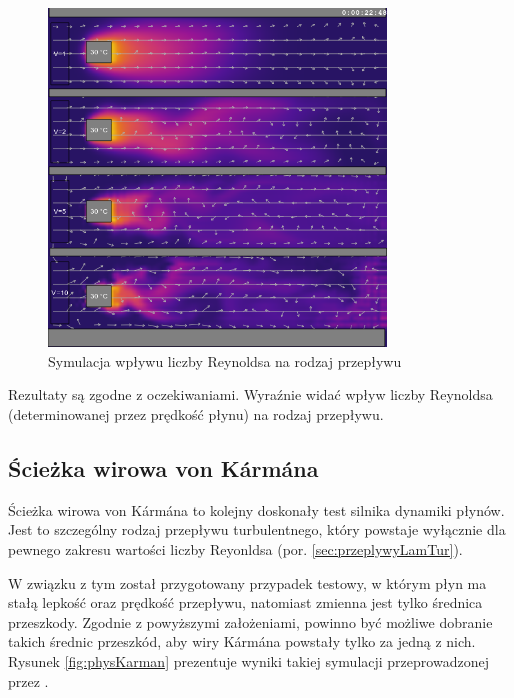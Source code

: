 \begin{figure}[!h]
\centering
\includegraphics[width=0.8\textwidth]{img/physics/laminarTurbulent}
\caption{Symulacja wpływu liczby Reynoldsa na rodzaj przepływu}
\label{fig:physLaminarTurbulent}
\end{figure}

Rezultaty są zgodne z oczekiwaniami. Wyraźnie widać wpływ liczby Reynoldsa
(determinowanej przez prędkość płynu) na rodzaj przepływu.

\subsection{Ścieżka wirowa von Kármána}

Ścieżka wirowa von Kármána to kolejny doskonały test silnika dynamiki płynów.
Jest to szczególny rodzaj przepływu turbulentnego, który powstaje wyłącznie dla
pewnego zakresu wartości liczby Reyonldsa (por. \ref{sec:przeplywyLamTur}).

W związku z tym został przygotowany przypadek testowy, w którym płyn ma stałą
lepkość oraz prędkość przepływu, natomiast zmienna jest tylko średnica
przeszkody. Zgodnie z powyższymi założeniami, powinno być możliwe dobranie
takich średnic przeszkód, aby wiry Kármána powstały tylko za jedną z nich.
Rysunek \ref{fig:physKarman} prezentuje wyniki takiej symulacji przeprowadzonej
przez \en.

